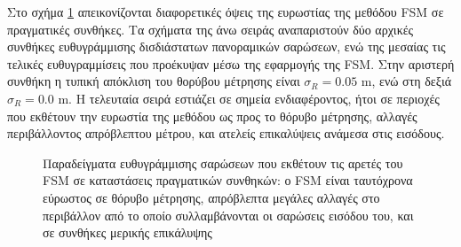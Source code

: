 Στο σχήμα \ref{fig:02_05_04:05} απεικονίζονται διαφορετικές όψεις της ευρωστίας
της μεθόδου FSM σε πραγματικές συνθήκες. Τα σχήματα της άνω σειράς
αναπαριστούν δύο αρχικές συνθήκες ευθυγράμμισης δισδιάστατων πανοραμικών
σαρώσεων, ενώ της μεσαίας τις τελικές ευθυγραμμίσεις που προέκυψαν μέσω της
εφαρμογής της FSM. Στην αριστερή συνθήκη η τυπική απόκλιση του θορύβου
μέτρησης είναι $\sigma_R = 0.05$ m, ενώ στη δεξιά $\sigma_R = 0.0$ m. Η
τελευταία σειρά εστιάζει σε σημεία ενδιαφέροντος, ήτοι σε περιοχές που εκθέτουν
την ευρωστία της μεθόδου ως προς το θόρυβο μέτρησης, αλλαγές περιβάλλοντος
απρόβλεπτου μέτρου, και ατελείς επικαλύψεις ανάμεσα στις εισόδους.

\begin{figure}[]\centering
  
  \vspace{-1cm}
  \caption{\small Παραδείγματα ευθυγράμμισης σαρώσεων που εκθέτουν τις αρετές
           του FSM σε καταστάσεις πραγματικών συνθηκών: ο FSM
           είναι ταυτόχρονα εύρωστος σε θόρυβο μέτρησης, απρόβλεπτα μεγάλες
           αλλαγές στο περιβάλλον από το οποίο συλλαμβάνονται οι σαρώσεις
           εισόδου του, και σε συνθήκες μερικής επικάλυψης}
  \label{fig:02_05_04:05}
\end{figure}
